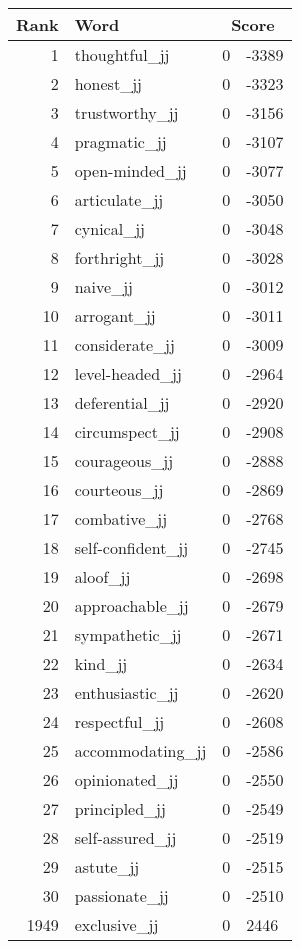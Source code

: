 \begin{longtable}[!htbp]{| rlr@{.}l |}
    \hline
    \textbf{Rank} & \textbf{Word} & \multicolumn{2}{c|}{\textbf{Score}} \\
    \hline
    \endhead
    1 & thoughtful\_jj & 0 & -3389 \\
    2 & honest\_jj & 0 & -3323 \\
    3 & trustworthy\_jj & 0 & -3156 \\
    4 & pragmatic\_jj & 0 & -3107 \\
    5 & open-minded\_jj & 0 & -3077 \\
    6 & articulate\_jj & 0 & -3050 \\
    7 & cynical\_jj & 0 & -3048 \\
    8 & forthright\_jj & 0 & -3028 \\
    9 & naive\_jj & 0 & -3012 \\
    10 & arrogant\_jj & 0 & -3011 \\
    11 & considerate\_jj & 0 & -3009 \\
    12 & level-headed\_jj & 0 & -2964 \\
    13 & deferential\_jj & 0 & -2920 \\
    14 & circumspect\_jj & 0 & -2908 \\
    15 & courageous\_jj & 0 & -2888 \\
    16 & courteous\_jj & 0 & -2869 \\
    17 & combative\_jj & 0 & -2768 \\
    18 & self-confident\_jj & 0 & -2745 \\
    19 & aloof\_jj & 0 & -2698 \\
    20 & approachable\_jj & 0 & -2679 \\
    21 & sympathetic\_jj & 0 & -2671 \\
    22 & kind\_jj & 0 & -2634 \\
    23 & enthusiastic\_jj & 0 & -2620 \\
    24 & respectful\_jj & 0 & -2608 \\
    25 & accommodating\_jj & 0 & -2586 \\
    26 & opinionated\_jj & 0 & -2550 \\
    27 & principled\_jj & 0 & -2549 \\
    28 & self-assured\_jj & 0 & -2519 \\
    29 & astute\_jj & 0 & -2515 \\
    30 & passionate\_jj & 0 & -2510 \\
    1949 & exclusive\_jj & 0 & 2446 \\

\end{longtable}
